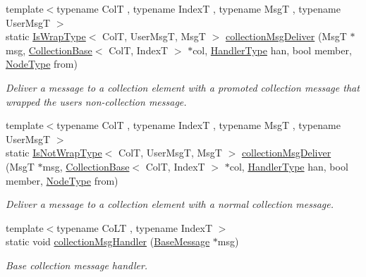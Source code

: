 \begin{DoxyCompactItemize}
{\footnotesize template$<$typename ColT , typename IndexT , typename MsgT , typename User\+MsgT $>$ }\\static \hyperlink{structvt_1_1vrt_1_1collection_1_1_collection_manager_a1f91c97ed52237c3a3576dfbbe87c8f8}{Is\+Wrap\+Type}$<$ ColT, User\+MsgT, MsgT $>$ \hyperlink{structvt_1_1vrt_1_1collection_1_1_collection_manager_a8335935e585268654043862f312d9fa0}{collection\+Msg\+Deliver} (MsgT $\ast$msg, \hyperlink{structvt_1_1vrt_1_1collection_1_1_collection_base}{Collection\+Base}$<$ ColT, IndexT $>$ $\ast$col, \hyperlink{namespacevt_af64846b57dfcaf104da3ef6967917573}{Handler\+Type} han, bool member, \hyperlink{namespacevt_a866da9d0efc19c0a1ce79e9e492f47e2}{Node\+Type} from)
\begin{DoxyCompactList}\small\item\em Deliver a message to a collection element with a promoted collection message that wrapped the user\textquotesingle{}s non-\/collection message. \end{DoxyCompactList}\item 
{\footnotesize template$<$typename ColT , typename IndexT , typename MsgT , typename User\+MsgT $>$ }\\static \hyperlink{structvt_1_1vrt_1_1collection_1_1_collection_manager_a18e3a17d9eb086c6c2f499242b7faa1e}{Is\+Not\+Wrap\+Type}$<$ ColT, User\+MsgT, MsgT $>$ \hyperlink{structvt_1_1vrt_1_1collection_1_1_collection_manager_ac92b9519a9c22103746e52375bc18b67}{collection\+Msg\+Deliver} (MsgT $\ast$msg, \hyperlink{structvt_1_1vrt_1_1collection_1_1_collection_base}{Collection\+Base}$<$ ColT, IndexT $>$ $\ast$col, \hyperlink{namespacevt_af64846b57dfcaf104da3ef6967917573}{Handler\+Type} han, bool member, \hyperlink{namespacevt_a866da9d0efc19c0a1ce79e9e492f47e2}{Node\+Type} from)
\begin{DoxyCompactList}\small\item\em Deliver a message to a collection element with a normal collection message. \end{DoxyCompactList}\item 
{\footnotesize template$<$typename Co\+LT , typename IndexT $>$ }\\static void \hyperlink{structvt_1_1vrt_1_1collection_1_1_collection_manager_a9b2bfe1f74298f0e9b7fdc4888f73e3d}{collection\+Msg\+Handler} (\hyperlink{namespacevt_ac34f95a5e2b8109b55bfba52b074443d}{Base\+Message} $\ast$msg)
\begin{DoxyCompactList}\small\item\em Base collection message handler. \end{DoxyCompactList}\item 

\end{DoxyCompactItemize}

